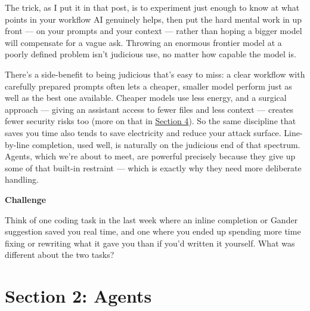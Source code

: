 \documentclass[
  letterpaper,
  DIV=11,
  numbers=noendperiod]{scrreprt}
\begin{document}
The trick, as I put it in that post, is to experiment just enough to
know at what points in your workflow AI genuinely helps, then put the
hard mental work in up front --- on your prompts and your context ---
rather than hoping a bigger model will compensate for a vague ask.
Throwing an enormous frontier model at a poorly defined problem isn't
judicious use, no matter how capable the model is.

There's a side-benefit to being judicious that's easy to miss: a clear
workflow with carefully prepared prompts often lets a cheaper, smaller
model perform just as well as the best one available. Cheaper models use
less energy, and a surgical approach --- giving an assistant access to
fewer files and less context --- creates fewer security risks too (more
on that in \href{../section-4-security-privacy/index.qmd}{Section 4}).
So the same discipline that saves you time also tends to save
electricity and reduce your attack surface. Line-by-line completion,
used well, is naturally on the judicious end of that spectrum. Agents,
which we're about to meet, are powerful precisely because they give up
some of that built-in restraint --- which is exactly why they need more
deliberate handling.

\begin{tcolorbox}[enhanced jigsaw, toprule=.15mm, rightrule=.15mm, left=2mm, leftrule=.75mm, breakable, opacityback=0, arc=.35mm, colframe=quarto-callout-important-color-frame, bottomrule=.15mm, colback=white]
\begin{minipage}[t]{5.5mm}
\textcolor{quarto-callout-important-color}{\faExclamation}
\end{minipage}%
\begin{minipage}[t]{\textwidth - 5.5mm}

\vspace{-3mm}\textbf{Challenge}\vspace{3mm}

Think of one coding task in the last week where an inline completion or
Gander suggestion saved you real time, and one where you ended up
spending more time fixing or rewriting what it gave you than if you'd
written it yourself. What was different about the two tasks?

\end{minipage}%
\end{tcolorbox}

\part{Section 2: Agents}
\end{document}
